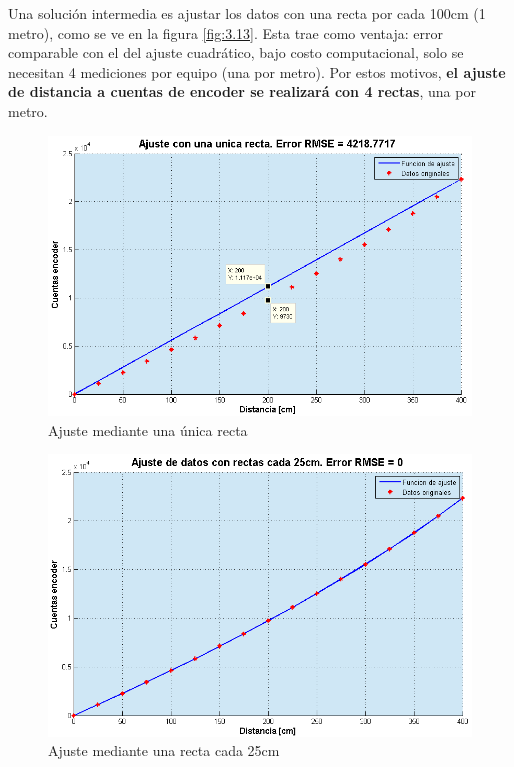 Una solución intermedia es ajustar los datos con una recta por cada 100cm (1 metro), como se ve en la figura \ref{fig:3.13}. Esta trae como ventaja: error comparable con el del ajuste cuadrático, bajo costo computacional, solo se necesitan 4 mediciones por equipo (una por metro). Por estos motivos, \textbf{el ajuste de distancia a cuentas de encoder se realizará con 4 rectas}, una por metro.


\begin{figure}[!ht]
	\centering
	\includegraphics[width=15cm,scale=1]{resources/3_11-ajusteRectasUnica.png}
	\caption{Ajuste mediante una única recta}
	\label{fig:\thefigure}
\end{figure}

\begin{figure}[!ht]
	\centering
	\includegraphics[width=15cm,scale=1]{resources/3_12-ajusteRectas25cm.png}
	\caption{Ajuste mediante una recta cada 25cm}
	\label{fig:\thefigure}
\end{figure}

